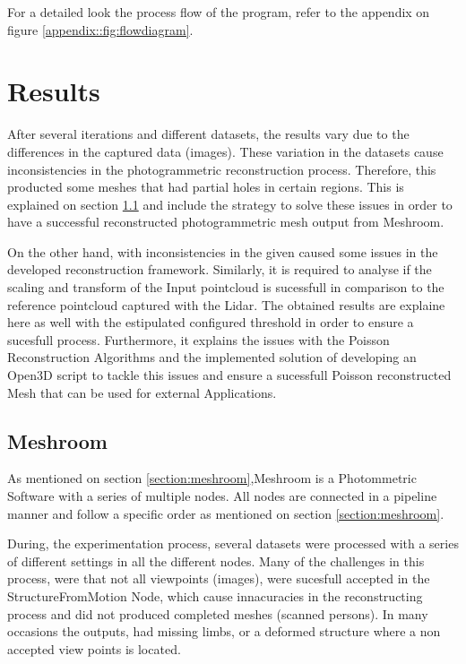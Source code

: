 \documentclass[12pt]{report}
\begin{document}
For a detailed look the process flow of the program, refer to the appendix on figure \ref{appendix::fig:flowdiagram}.

\chapter{Results}
After several iterations and different datasets, the results vary due to the differences in the captured data (images). 
These variation in the datasets cause inconsistencies in the photogrammetric reconstruction process. Therefore, this producted some meshes that had partial holes in certain regions.
This is explained on section \ref{section:meshroom_results} and include the strategy to solve these issues in order to have a successful reconstructed photogrammetric mesh output from Meshroom.

On the other hand, with inconsistencies in the given caused some issues in the developed reconstruction framework.
Similarly, it is required to analyse if the scaling and transform of the Input pointcloud is sucessfull in comparison to the reference pointcloud captured with the Lidar. 
The obtained results are explaine here as well with the estipulated configured threshold in order to ensure a sucesfull process.
Furthermore, it explains the issues with the Poisson Reconstruction Algorithms and the implemented solution of developing an Open3D script to tackle this issues and ensure a sucessfull Poisson reconstructed Mesh that can be used for external Applications. 

\section{Meshroom}
\label{section:meshroom_results}
As mentioned on section \ref{section:meshroom},Meshroom is a Photommetric Software with a series of multiple nodes. All  nodes are connected in a pipeline manner and follow a specific order as mentioned on section \ref{section:meshroom}.

During, the experimentation process, several datasets were processed with a series of different settings in all the different nodes. 
Many of the challenges in this process, were that not all viewpoints (images), were sucesfull accepted in the StructureFromMotion Node, which cause innacuracies in the reconstructing process and did not produced completed meshes (scanned persons).
In many occasions the outputs, had missing limbs, or a deformed structure where a non accepted view points is located.
\end{document}
